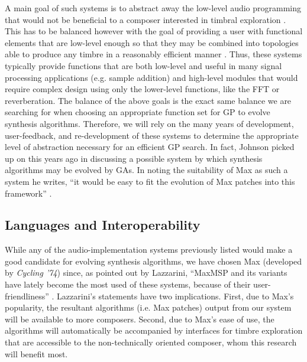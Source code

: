 \documentclass[12pt]{report} 	%
\numberwithin{figure}{chapter}
\numberwithin{table}{chapter}
\numberwithin{equation}{chapter}
\begin{document}
\begin{flushleft}
A main goal of such systems is to abstract away the low-level audio programming that would not be beneficial to a composer interested in timbral exploration \cite[p. 1]{Moreno:2005bs}. This has to be balanced however with the goal of providing a user with functional elements that are low-level enough so that they may be combined into topologies able to produce any timbre in a reasonably efficient manner \cite[p. 1]{Moreno:2005bs}. Thus, these systems typically provide functions that are both low-level and useful in many signal processing applications (e.g. sample addition) and high-level modules that would require complex design using only the lower-level functions, like the FFT or reverberation. The balance of the above goals is the exact same balance we are searching for when choosing an appropriate function set for GP to evolve synthesis algorithms. Therefore, we will rely on the many years of development, user-feedback, and re-development of these systems to determine the appropriate level of abstraction necessary for an efficient GP search. In fact, Johnson picked up on this years ago in discussing a possible system by which synthesis algorithms may be evolved by GAs. In noting the suitability of Max as such a system he writes, ``it would be easy to fit the evolution of Max patches into this framework'' \cite[p. 6]{Johnson:1998sh}.

\vspace{12pt}
\subsection{Languages and Interoperability}
While any of the audio-implementation systems previously listed would make a good candidate for evolving synthesis algorithms, we have chosen Max (developed by \textit{Cycling '74}) since, as pointed out by Lazzarini, ``MaxMSP and its variants have lately become the most used of these systems, because of their user-friendliness'' \cite[p. 356]{Lazzarini:2004qf}. Lazzarini's statements have two implications. First, due to Max's popularity, the resultant algorithms (i.e. Max patches) output from our system will be available to more composers. Second, due to Max's ease of use, the algorithms will automatically be accompanied by interfaces for timbre exploration that are accessible to the non-technically oriented composer, whom this research will benefit most.


\end{flushleft}
\end{document}
